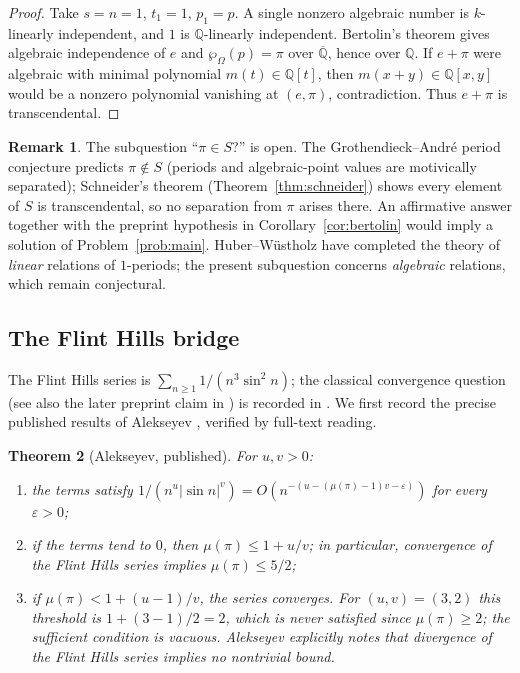 \documentclass[11pt]{amsart}
\newtheorem{theorem}{Theorem}[section]
\theoremstyle{definition}
\newtheorem{remark}[theorem]{Remark}
\theoremstyle{remark}
\numberwithin{equation}{section}
\newcommand{\Q}{\mathbb{Q}}
\newcommand{\Qbar}{\overline{\mathbb{Q}}}
\newcommand{\irr}{\mu}
\newcommand{\ee}{e}
\begin{document}
\begin{proof}
Take $s=n=1$, $t_1=1$, $p_1=p$. A single nonzero algebraic number is $k$-linearly independent, and $1$ is $\Q$-linearly independent. Bertolin's theorem gives algebraic independence of $\ee$ and $\wp_\Omega(p)=\pi$ over $\Qbar$, hence over $\Q$. If $e+\pi$ were algebraic with minimal polynomial $m(t)\in\Q[t]$, then $m(x+y)\in\Q[x,y]$ would be a nonzero polynomial vanishing at $(e,\pi)$, contradiction. Thus $e+\pi$ is transcendental.
\end{proof}

\begin{remark}
The subquestion ``$\pi\in S$?'' is open. The Grothendieck--André period conjecture predicts $\pi\notin S$ (periods and algebraic-point values are motivically separated); Schneider's theorem (Theorem~\ref{thm:schneider}) shows every element of $S$ is transcendental, so no separation from $\pi$ arises there. An affirmative answer together with the preprint hypothesis in Corollary~\ref{cor:bertolin} would imply a solution of Problem~\ref{prob:main}. Huber--W\"ustholz \cite{HuberWustholz2022} have completed the theory of \emph{linear} relations of $1$-periods; the present subquestion concerns \emph{algebraic} relations, which remain conjectural.
\end{remark}

\subsection{The Flint Hills bridge}\label{sec:flint-bridge}

The Flint Hills series is $\sum_{n\ge1}1/(n^3\sin^2n)$; the classical convergence question (see also the later preprint claim in \cite{OpenAI2026}) is recorded in \cite{Alekseyev2011,FormalConjectures}. We first record the precise published results of Alekseyev \cite{Alekseyev2011}, verified by full-text reading.

\begin{theorem}[Alekseyev, published]\label{thm:alekseyev}
For $u,v>0$:
\begin{enumerate}
\item the terms satisfy $1/(n^u|\sin n|^v)=O(n^{-(u-(\irr(\pi)-1)v-\varepsilon)})$ for every $\varepsilon>0$;
\item if the terms tend to $0$, then $\irr(\pi)\le1+u/v$; in particular, convergence of the Flint Hills series implies $\irr(\pi)\le5/2$;
\item if $\irr(\pi)<1+(u-1)/v$, the series converges. For $(u,v)=(3,2)$ this threshold is $1+(3-1)/2=2$, which is never satisfied since $\irr(\pi)\ge2$; the sufficient condition is vacuous. Alekseyev explicitly notes that divergence of the Flint Hills series implies no nontrivial bound.
\end{enumerate}
\end{theorem}
\end{document}
